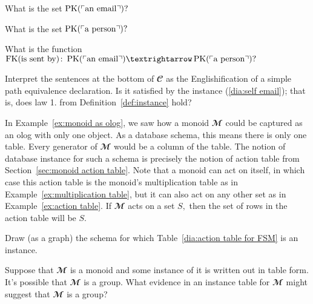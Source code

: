 \documentclass[../main/CT4S-EN-RU]{subfiles}
\begin{document}
\begin{exerciseENG}
\sexc What is the set $\operatorname{PK}(\textnormal{$\ulcorner$an email$\urcorner$})?$ 
\item What is the set $\operatorname{PK}(\textnormal{$\ulcorner$a person$\urcorner$})?$ 
\item What is the function $\FK(\tn{is sent by})\colon\PK(\fakebox{an email}){→}\PK(\fakebox{a person})?$
\item Interpret the sentences at the bottom of ${𝓒}$ as the Englishification of a simple path equivalence declaration. Is it satisfied by the instance (\ref{dia:self email}); that is, does law 1. from Definition~\ref{def:instance} hold?
\endsexc
\end{exerciseENG}

\begin{exerciseRUS}\label{ex:self email}
\end{exerciseRUS}

\begin{exampleENG}\label{ex:monoid action table}
In Example~\ref{ex:monoid as olog}, we saw how a monoid ${𝓜}$ could be captured as an olog with only one object. As a database schema, this means there is only one table. Every generator of ${𝓜}$ would be a column of the table. The notion of database instance for such a schema is precisely the notion of action table from Section~\ref{sec:monoid action table}. Note that a monoid can act on itself, in which case this action table is the monoid's multiplication table as in Example~\ref{ex:multiplication table}, but it can also act on any other set as in Example~\ref{ex:action table}. If ${𝓜}$ acts on a set $S,$ then the set of rows in the action table will be $S.$
\end{exampleENG}

\begin{exampleRUS}\label{ex:monoid action table}
\end{exampleRUS}

\begin{exerciseENG}
Draw (as a graph) the schema for which Table~\ref{dia:action table for FSM} is an instance.
\end{exerciseENG}

\begin{exerciseRUS}
\end{exerciseRUS}

\begin{exerciseENG}
Suppose that ${𝓜}$ is a monoid and some instance of it is written out in table form. It's possible that ${𝓜}$ is a group. What evidence in an instance table for ${𝓜}$ might suggest that ${𝓜}$ is a group? 
\end{exerciseENG}
\end{document}
